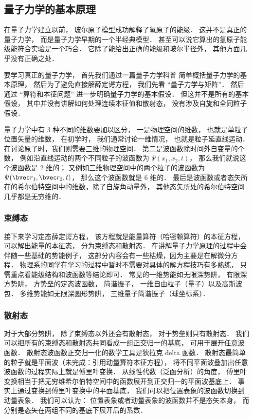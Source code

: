 \subsection{量子力学的基本原理}

在量子力学建立以前， 玻尔原子模型成功解释了氢原子的能级． 这并不是真正的量子力学， 而是量子力学早期的一个半经典模型． 甚至可以说它算出的氢原子能级能符合实验是一个巧合． 它除了能给出正确的能级和玻尔半径外， 其他方面几乎没有正确之处．

要学习真正的量子力学， 首先我们通过一篇量子力学科普 简单概括量子力学的基本原理， 然后为了避免直接解薛定谔方程， 我们先看 “量子力学与矩阵”． 然后通过 “算符和本征问题” 进一步明确量子力学的基本假设． 但这并不是所有的基本假设， 其中并没有讲解如何处理连续本征值和散射态， 没有涉及自旋和全同粒子假设．

量子力学中有 3 种不同的维数要加以区分， 一是物理空间的维数， 也就是单粒子位置矢量的维数， 在初学时， 我们通常讨论一维情况， 也就是粒子延直线运动． 在讨论原子时，我们则需要三维的物理空间． 第二是波函数除时间外自变量的个数， 例如沿直线运动的两个不同粒子的波函数为 $\Psi(x_1,x_2,t)$， 那么我们就说这个波函数是 2 维的； 又例如三维物理空间中的两个粒子的波函数为 $\Psi(\bvec r_1, \bvec r_2, t)$， 那么这个波函数就是 6 维的． 最后是波函数或者态矢所在的希尔伯特空间中的维数，除了自旋角动量外， 其他态矢所处的希尔伯特空间几乎都是无穷维的．

\subsubsection{束缚态}
接下来学习定态薛定谔方程， 该方程就是能量算符（哈密顿算符）的本征方程， 可以解出能量的本征态， 分为束缚态和散射态． 在讲解量子力学原理的过程中会伴随一些基础的势能例子， 这部分内容会有一些枯燥，因为主要是在解微分方程． 物理系的同学在学习的过程中暂时不需要对具体的解方程技巧有多熟练， 只需重点看能级结构和波函数等结论即可． 常见的一维势能如无限深势阱， 有限深方势阱， 方势垒的定态波函数， 简谐振子， 一维自由粒子（量子）以及高斯波包． 多维势能如无限深圆形势阱， 三维量子简谐振子（球坐标系）．

\subsubsection{散射态}
对于大部分势阱， 除了束缚态以外还会有散射态， 对于势垒则只有散射态． 我们可以把所有的束缚态和散射态共同看成一组正交归一的基底， 可用于展开任意波函数． 散射态波函数正交归一化的数学工具是狄拉克 delta 函数． 散射态最简单的粒子就是平面波（未完成：引用动量算符本征方程）， 将不同平面波叠加出任意波函数的过程实际上就是傅里叶变换． 从线性代数（泛函分析）的角度， 傅里叶变换相当于把无穷维希尔伯特空间中的函数展开到正交归一的平面波基底上． 事实上通过变换到傅里叶变换中的平面基底， 我们可以把位置表象的波函数切换到动量表象． 我们可以认为： 位置表象或者动量表象的波函数并不是态矢本身， 而分别是态矢在两组不同的基底下展开后的系数．

